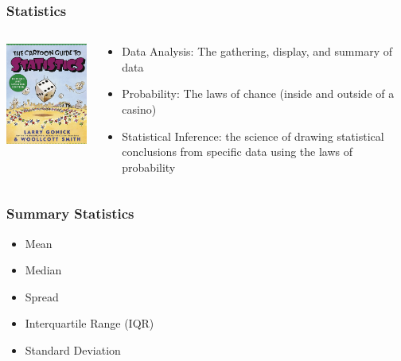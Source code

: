\documentclass{beamer}
\begin{document}
\begin{frame}\frametitle{Statistics}
\begin{columns}
\begin{column}{5cm}
\begin{center}
\includegraphics[width=5cm]{fig/cartoonguidestats.jpg}
\end{center}
\end{column}
\begin{column}{5cm}
\begin{itemize}
\item Data Analysis: The gathering, display, and summary of data
\item Probability: The laws of chance (inside and outside of a casino)
\item Statistical Inference: the science of drawing statistical conclusions from specific data using the laws of probability
\end{itemize}
\end{column}
\end{columns}
\end{frame}

\begin{frame}\frametitle{Summary Statistics}
\begin{itemize}
\item Mean
\item Median
\item Spread
\item Interquartile Range (IQR)
\item Standard Deviation
\end{itemize}
\end{frame}
\end{document}

